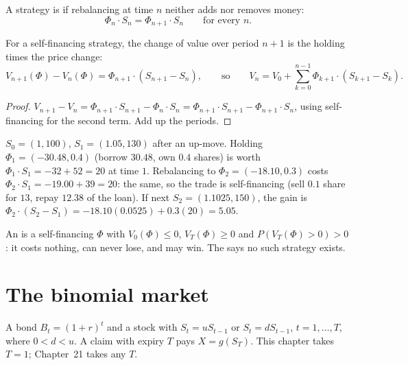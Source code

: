 \begin{definition}
A strategy is  if rebalancing at time $n$ neither adds nor removes money:
\[
  \Phi_n\cdot S_n=\Phi_{n+1}\cdot S_n\qquad\text{for every }n .
\]
\end{definition}

\begin{result}
\label{res:gains}
For a self-financing strategy, the change of value over period $n+1$ is the holding times the price change:
\[
  V_{n+1}(\Phi)-V_n(\Phi)=\Phi_{n+1}\cdot(S_{n+1}-S_n),\qquad\text{so}\qquad V_n=V_0+\sum_{k=0}^{n-1}\Phi_{k+1}\cdot(S_{k+1}-S_k).
\]
\end{result}
\begin{proof}
$V_{n+1}-V_n=\Phi_{n+1}\cdot S_{n+1}-\Phi_n\cdot S_n=\Phi_{n+1}\cdot S_{n+1}-\Phi_{n+1}\cdot S_n$, using self-financing for the second term. Add up the periods.
\end{proof}

\begin{example}
$S_0=(1,100)$, $S_1=(1.05,130)$ after an up-move. Holding $\Phi_1=(-30.48,0.4)$ (borrow $30.48$, own $0.4$ shares) is worth $\Phi_1\cdot S_1=-32+52=20$ at time $1$. Rebalancing to $\Phi_2=(-18.10,0.3)$ costs $\Phi_2\cdot S_1=-19.00+39=20$: the same, so the trade is self-financing (sell $0.1$ share for $13$, repay $12.38$ of the loan). If next $S_2=(1.1025,150)$, the gain is $\Phi_2\cdot(S_2-S_1)=-18.10(0.0525)+0.3(20)=5.05$.
\end{example}

\begin{definition}
An  is a self-financing $\Phi$ with $V_0(\Phi)\le0$, $V_T(\Phi)\ge0$ and $P(V_T(\Phi)>0)>0$: it costs nothing, can never lose, and may win. The  says no such strategy exists.
\end{definition}

\section{The binomial market}

\begin{setup}
A bond $B_t=(1+r)^t$ and a stock with $S_t=uS_{t-1}$ or $S_t=dS_{t-1}$, $t=1,\dots,T$, where $0<d<u$. A claim with expiry $T$ pays $X=g(S_T)$. This chapter takes $T=1$; Chapter~21 takes any $T$.
\end{setup}

